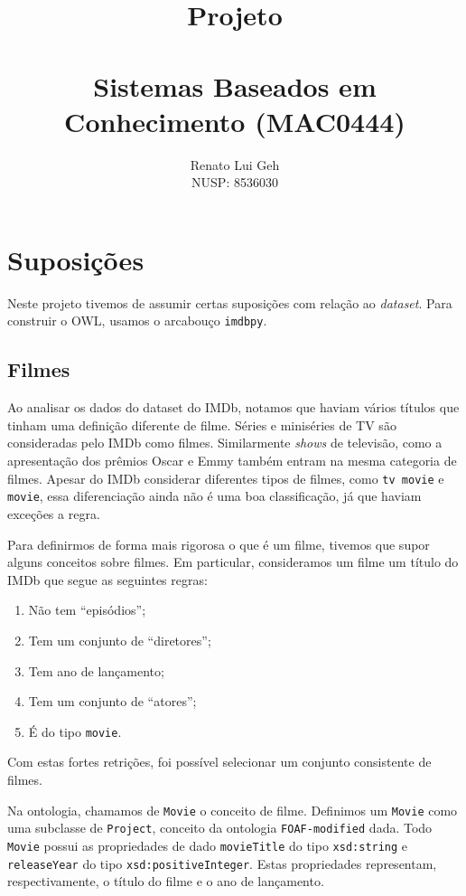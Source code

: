 \documentclass{article}
\title{\Huge Projeto\\~\\\LARGE Sistemas Baseados em Conhecimento (MAC0444)}
\date{}
\author{\Large{Renato Lui Geh}\\\large{NUSP\@: 8536030}\\}
\newcommand{\code}[1]{\lstinline[mathescape=true]{#1}}
\begin{document}
\maketitle
\newpage

\section{Suposições}

Neste projeto tivemos de assumir certas suposições com relação ao \textit{dataset}. Para construir
o OWL, usamos o arcabouço \code{imdbpy}.

\subsection{Filmes}

Ao analisar os dados do dataset do IMDb, notamos que haviam vários títulos que tinham uma definição
diferente de filme. Séries e miniséries de TV são consideradas pelo IMDb como filmes. Similarmente
\textit{shows} de televisão, como a apresentação dos prêmios Oscar e Emmy também entram na mesma
categoria de filmes. Apesar do IMDb considerar diferentes tipos de filmes, como \code{tv movie} e
\code{movie}, essa diferenciação ainda não é uma boa classificação, já que haviam exceções a regra.

Para definirmos de forma mais rigorosa o que é um filme, tivemos que supor alguns conceitos sobre
filmes. Em particular, consideramos um filme um título do IMDb que segue as seguintes regras:

\begin{enumerate}
  \item Não tem ``episódios'';
  \item Tem um conjunto de ``diretores'';
  \item Tem ano de lançamento;
  \item Tem um conjunto de ``atores'';
  \item É do tipo \code{movie}.
\end{enumerate}

Com estas fortes retrições, foi possível selecionar um conjunto consistente de filmes.

Na ontologia, chamamos de \code{Movie} o conceito de filme. Definimos um \code{Movie} como uma
subclasse de \code{Project}, conceito da ontologia \code{FOAF-modified} dada. Todo \code{Movie}
possui as propriedades de dado \code{movieTitle} do tipo \code{xsd:string} e \code{releaseYear} do
tipo \code{xsd:positiveInteger}. Estas propriedades representam, respectivamente, o título do
filme e o ano de lançamento.
\end{document}
